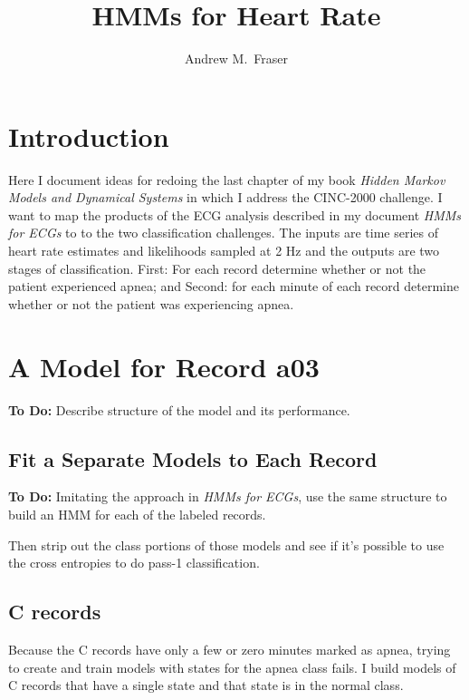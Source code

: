 \documentclass[12pt]{article}
\title{HMMs for Heart Rate}
\author{Andrew M.\ Fraser}
\begin{document}
\maketitle

\section{Introduction}
\label{sec:introduction}

Here I document ideas for redoing the last chapter of my book
\emph{Hidden Markov Models and Dynamical Systems} in which I address
the CINC-2000 challenge.  I want to map the products of the ECG
analysis described in my document \emph{HMMs for ECGs} to to the two
classification challenges.  The inputs are time series of heart rate
estimates and likelihoods sampled at 2 Hz and the outputs are
two stages of classification.  First: For each record determine
whether or not the patient experienced apnea; and Second: for each
minute of each record determine whether or not the patient was
experiencing apnea.

\section{A Model for Record a03}
\label{sec:a03}

\textbf{To Do:}  Describe structure of the model and its performance.

\subsection{Fit a Separate Models to Each Record}
\label{sec:selves}

\textbf{To Do:} Imitating the approach in \emph{HMMs for ECGs}, use
the same structure to build an HMM for each of the labeled records.

Then strip out the class portions of those models and see if it's
possible to use the cross entropies to do pass-1 classification.

\subsection{C records}
\label{sec:c_records}

Because the C records have only a few or zero minutes marked as apnea,
trying to create and train models with states for the apnea class
fails.  I build models of C records that have a single state and that
state is in the normal class.
\end{document}
